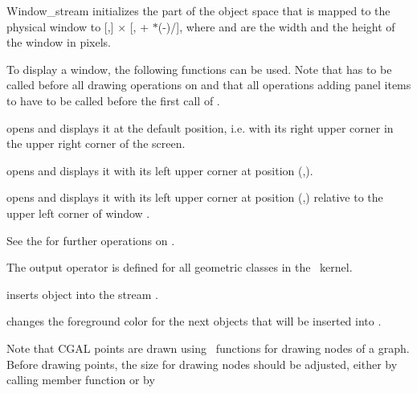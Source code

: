 \begin{ccClass} {Window_stream}
{initializes the  part of the object space that is mapped to the physical
window to [,] $\times$ 
[, + $*$(-)/],
where  and  are the width and the height of the window in pixels.}

To display a window, the following functions can be used. Note that  
has to be called before all drawing operations on  and that all operations adding 
panel items to  have to be called before the first call of .

{opens  and displays it at the default position, i.e. 
with its right upper corner in the upper right corner of the screen.}

{opens  and displays it with its left upper corner at position
(,).}

{opens  and displays it with its left upper corner at position 
(,) relative to the upper left corner of  window .}

See the 
\cite{mnsu-lum} for further operations on .

\def\ccTagRmEigenClassName{\ccFalse}


The output operator is defined for all geometric classes in the \cgal\ kernel.

       {inserts object  into the stream \ccVar.}

       {changes the foreground color for the next objects that
        will be inserted into \ccVar.}

Note that CGAL points are drawn using \leda\ functions for drawing nodes of a graph.
Before drawing points, the size for drawing nodes should be adjusted, either by calling
member function  or by 


\end{ccClass}

